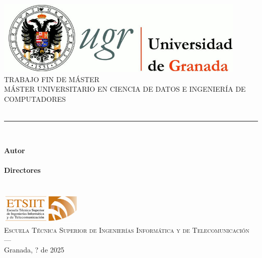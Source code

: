 \begin{titlepage}
 
 
\newlength{\centeroffset}
\setlength{\centeroffset}{-0.5\oddsidemargin}
\addtolength{\centeroffset}{0.5\evensidemargin}
\thispagestyle{empty}

\noindent\hspace*{\centeroffset}\begin{minipage}{\textwidth}

\centering
\includegraphics[width=0.9\textwidth]{figures/front_page/logo_ugr.jpg}\\[1.4cm]

\textsc{ \Large TRABAJO FIN DE MÁSTER\\[0.2cm]}
\textsc{ MÁSTER UNIVERSITARIO EN CIENCIA DE DATOS E INGENIERÍA DE COMPUTADORES}\\[1cm]
% 
{\Large\bfseries \myTitle\\}
\noindent\rule[-1ex]{\textwidth}{3pt}\\[3.5ex]
\end{minipage}

\vspace{2.5cm}
\noindent\hspace*{\centeroffset}\begin{minipage}{\textwidth}
\centering

\textbf{Autor}\\ {\myName}\\[2.5ex]
\textbf{Directores}\\
{\myProf\\
\myOtherProf}\\[2cm]
\includegraphics[width=0.3\textwidth]{figures/front_page/etsiit_logo.png}\\[0.1cm]
\textsc{Escuela Técnica Superior de Ingenierías Informática y de Telecomunicación}\\
\textsc{---}\\
Granada, ? de 2025
\end{minipage}
\end{titlepage}


